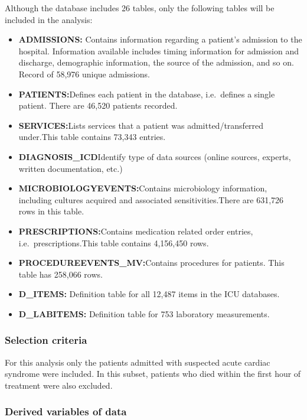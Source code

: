 \documentclass[
]{article}
\providecommand{\tightlist}{%
  \setlength{\itemsep}{0pt}\setlength{\parskip}{0pt}}
\begin{document}
Although the database includes 26 tables, only the following tables will
be included in the analysis:

\begin{itemize}
\tightlist
\item
  \textbf{ADMISSIONS:} Contains information regarding a patient's
  admission to the hospital. Information available includes timing
  information for admission and discharge, demographic information, the
  source of the admission, and so on. Record of 58,976 unique
  admissions.
\item
  \textbf{PATIENTS:}Defines each patient in the database, i.e.~defines a
  single patient. There are 46,520 patients recorded.
\item
  \textbf{SERVICES:}Lists services that a patient was
  admitted/transferred under.This table contains 73,343 entries.
\item
  \textbf{DIAGNOSIS\_ICD}Identify type of data sources (online sources,
  experts, written documentation, etc.)
\item
  \textbf{MICROBIOLOGYEVENTS:}Contains microbiology information,
  including cultures acquired and associated sensitivities.There are
  631,726 rows in this table.
\item
  \textbf{PRESCRIPTIONS:}Contains medication related order entries,
  i.e.~prescriptions.This table contains 4,156,450 rows.
\item
  \textbf{PROCEDUREEVENTS\_MV:}Contains procedures for patients. This
  table has 258,066 rows.
\item
  \textbf{D\_ITEMS:} Definition table for all 12,487 items in the ICU
  databases.
\item
  \textbf{D\_LABITEMS:} Definition table for 753 laboratory
  measurements.
\end{itemize}

\hypertarget{selection-criteria}{%
\subsubsection{Selection criteria}\label{selection-criteria}}

For this analysis only the patients admitted with suspected acute
cardiac syndrome were included. In this subset, patients who died within
the first hour of treatment were also excluded.

\hypertarget{derived-variables-of-data}{%
\subsubsection{Derived variables of
data}\label{derived-variables-of-data}}
\end{document}
